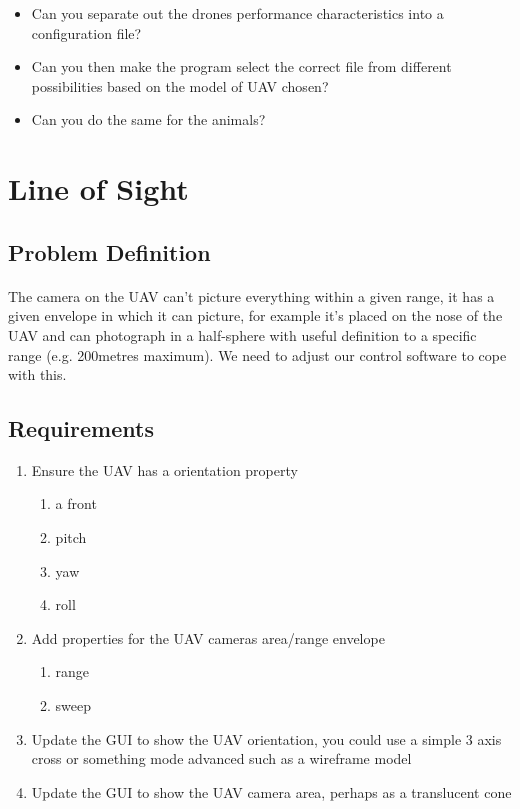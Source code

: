 \documentclass[11pt]{book}
\begin{document}
\begin{itemize}
\item Can you separate out the drones performance characteristics into a configuration file?
\item Can you then make the program select the correct file from different possibilities based on the model of UAV chosen? 
\item Can you do the same for the animals?
\end{itemize}

\clearpage



\section{Line of Sight}

\subsection{Problem Definition}

\paragraph{} The camera on the UAV can't picture everything within a given range, it has a given envelope in which it can picture, for example it's placed on the nose of the UAV and can photograph in a half-sphere with useful definition to a specific range (e.g. 200metres maximum). We need to adjust our control software to cope with this.

\subsection{Requirements}

\begin{enumerate}
\item Ensure the UAV has a orientation property
     \begin{enumerate}
         \item a front
         \item pitch
         \item yaw
         \item roll
     \end{enumerate}
\item Add properties for the UAV cameras area/range envelope
     \begin{enumerate}
         \item range
         \item sweep
     \end{enumerate}
\item Update the GUI to show the UAV orientation, you could use a simple 3 axis cross or something mode advanced such as a wireframe model
\item Update the GUI to show the UAV camera area, perhaps as a translucent cone
\end{enumerate}
\end{document}
